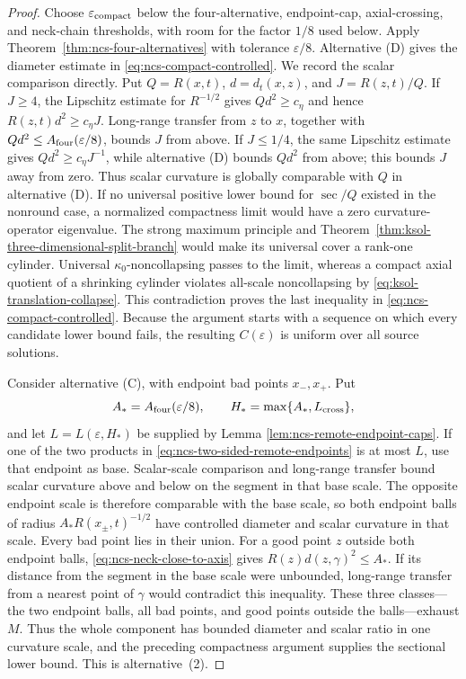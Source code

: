 \documentclass[10pt]{coll-l}
\theoremstyle{definition}
\theoremstyle{remark}
\numberwithin{section}{chapter}
\numberwithin{equation}{chapter}
\begin{document}
\begin{proof}
Choose $\varepsilon_{\rm compact}$ below the four-alternative,
endpoint-cap, axial-crossing, and neck-chain thresholds, with room for the
factor $1/8$ used below.
Apply Theorem~\ref{thm:ncs-four-alternatives} with tolerance
$\varepsilon/8$.  Alternative (D) gives the
diameter estimate in \eqref{eq:ncs-compact-controlled}.  We record the
scalar comparison directly.  Put $Q=R(x,t)$,
$d=d_t(x,z)$, and $J=R(z,t)/Q$.  If $J\geq4$, the Lipschitz estimate for
$R^{-1/2}$ gives $Qd^2\geq c_\eta$ and hence
$R(z,t)d^2\geq c_\eta J$.  Long-range transfer from $z$ to $x$, together
with $Qd^2\leq A_{\rm four}(\varepsilon/8)$, bounds $J$ from above.  If
$J\leq1/4$, the same Lipschitz estimate gives
$Qd^2\geq c_\eta J^{-1}$, while alternative (D) bounds $Qd^2$ from above;
this bounds $J$ away from zero.  Thus scalar curvature is globally
comparable with $Q$ in alternative (D).  If no universal positive lower bound for
$\sec/Q$ existed in the nonround case, a normalized compactness limit would
have a zero curvature-operator eigenvalue.  The strong maximum principle
and Theorem~\ref{thm:ksol-three-dimensional-split-branch} would make its
universal cover a rank-one cylinder.  Universal $\kappa_0$-noncollapsing
passes to the limit, whereas a compact axial quotient of a shrinking
cylinder violates all-scale noncollapsing by
\eqref{eq:ksol-translation-collapse}.  This contradiction proves the last
inequality in \eqref{eq:ncs-compact-controlled}.  Because the argument
starts with a sequence on which every candidate lower bound fails, the
resulting $C(\varepsilon)$ is uniform over all source solutions.

Consider alternative (C), with endpoint bad points $x_-,x_+$.  Put
\begin{equation}
 A_*=A_{\rm four}(\varepsilon/8),
 \qquad H_*=\max\{A_*,L_{\rm cross}\},                \label{eq:ncs-compact-middle-constants}
\end{equation}
and let $L=L(\varepsilon,H_*)$ be supplied by Lemma
\ref{lem:ncs-remote-endpoint-caps}.  If one of the two products in
\eqref{eq:ncs-two-sided-remote-endpoints} is at most $L$, use that endpoint
as base.  Scalar-scale comparison and long-range transfer bound scalar
curvature above and below on the segment in that base scale.  The opposite
endpoint scale is therefore comparable with the base scale, so both
endpoint balls of radius $A_*R(x_\pm,t)^{-1/2}$ have controlled diameter
and scalar curvature in that scale.  Every bad point lies in their union.
For a good point $z$ outside both endpoint balls,
\eqref{eq:ncs-neck-close-to-axis} gives
$R(z)d(z,\gamma)^2\leq A_*$.  If its distance from the segment in the base
scale were unbounded, long-range transfer from a nearest point of
$\gamma$ would contradict this inequality.  These three classes---the two
endpoint balls, all bad points, and good points outside the balls---exhaust
$M$.  Thus the whole component has bounded diameter and scalar ratio in
one curvature scale, and the preceding compactness argument supplies the
sectional lower bound.  This is alternative~(2).


\end{proof}
\end{document}
